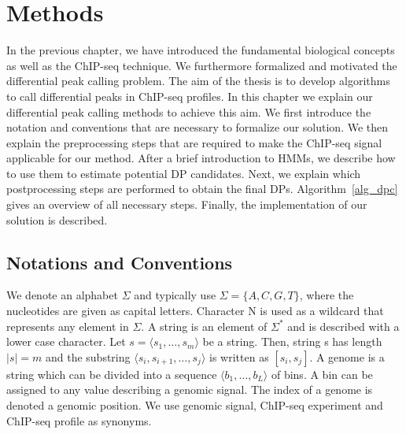 \chapter{Methods}
\label{chapter_methods}
In the previous chapter, we have introduced the fundamental biological concepts as well as the ChIP-seq technique. 
We furthermore formalized and motivated the differential peak calling problem.
The aim of the thesis is to develop algorithms to call differential peaks in ChIP-seq profiles.
In this chapter we explain our differential peak calling methods to achieve this aim.
We first introduce the notation and conventions that are necessary to formalize our solution.
We then explain the preprocessing steps that are required to make the ChIP-seq signal applicable for our method.
After a brief introduction to HMMs, we describe how to use them to estimate potential DP candidates.
Next, we explain which postprocessing steps are performed to obtain the final DPs.
Algorithm~\ref{alg_dpc} gives an overview of all necessary steps.
Finally, the implementation of our solution is described.


\section{Notations and Conventions}
We denote an alphabet $\Sigma$ and typically use $\Sigma = \{A, C, G, T\}$, where the nucleotides are given as capital letters.
Character N is used as a wildcard that represents any element in $\Sigma$.
A string is an element of $\Sigma^{*}$ and is described with a lower case character.
Let $s = \langle s_1, \ldots, s_m \rangle$ be a string.
Then, string s has length $|s| = m $ and the substring $\langle s_i, s_{i+1}, \ldots, s_j \rangle$ is written as $[s_i, s_j]$.
A genome is a string which can be divided into a sequence $\langle b_1, \ldots, b_L\rangle$ of bins.
A bin can be assigned to any value describing a genomic signal.
The index of a genome is denoted a genomic position.
We use genomic signal, ChIP-seq experiment and ChIP-seq profile as synonyms.

